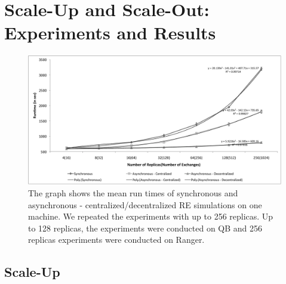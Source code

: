 \documentclass{rspublic}
\begin{document}
\section{Scale-Up and Scale-Out: Experiments and Results}

%
\begin{figure}
\centering
\includegraphics[scale=0.50]{scale_up.pdf}
\caption{\small The graph shows the mean run times of synchronous and asynchronous - centralized/decentralized RE simulations on one machine. We repeated the experiments with up to 256 replicas. Up to 128 replicas, the experiments were conducted on QB and 256 replicas experiments were conducted on Ranger.}
\label{fig:graph}
\vspace{-1em}
\end{figure}




\subsection{Scale-Up}
\end{document}
